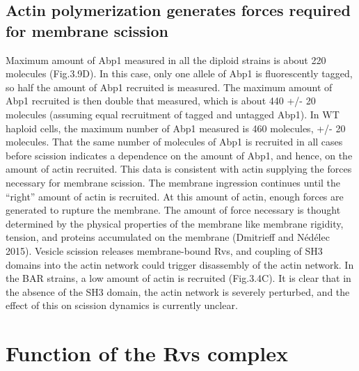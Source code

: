 {\subsection{ Actin polymerization generates forces required for membrane scission}
Maximum amount of Abp1 measured in all the diploid strains is about 220 molecules (Fig.3.9D). In this case, only one allele of Abp1 is fluorescently tagged, so half the amount of Abp1 recruited is measured. The maximum amount of Abp1 recruited is then double that measured, which is about 440 +/- 20 molecules (assuming equal recruitment of tagged and untagged Abp1). In WT haploid cells, the maximum number of Abp1 measured is 460 molecules, +/- 20 molecules. That the same number of molecules of Abp1 is recruited in all cases before scission indicates a dependence on the amount of Abp1, and hence, on the amount of actin recruited. This data is consistent with actin supplying the forces necessary for membrane scission. The membrane ingression continues until the “right” amount of actin is recruited. At this amount of actin, enough forces are generated to rupture the membrane. The amount of force necessary is thought determined by the physical properties of the membrane like membrane rigidity, tension, and proteins accumulated on the membrane (Dmitrieff and Nédélec 2015). Vesicle scission releases membrane-bound Rvs, and coupling of SH3 domains into the actin network could trigger disassembly of the actin network. In the BAR strains, a low amount of actin is recruited (Fig.3.4C). It is clear that in the absence of the SH3 domain, the actin network is severely perturbed, and the effect of this on scission dynamics is currently unclear. 



\section{Function of the Rvs complex}

}
